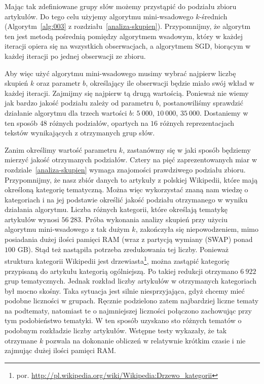 \documentclass{praca1}
\begin{document}
Mając tak zdefiniowane grupy słów możemy przystąpić do podziału zbioru artykułów. Do tego celu użyjemy algorytmu mini-wsadowego $k$-średnich (Algorytm~\ref{alg:003} z rozdziału~\ref{analiza-skupien}). Przypomnijmy, że algorytm ten jest metodą pośrednią pomiędzy algorytmem wsadowym, który w każdej iteracji opiera się na wszystkich obserwacjach, a algorytmem SGD, biorącym w każdej iteracji po jednej obserwacji ze zbioru. 

Aby więc użyć algorytmu mini-wsadowego musimy wybrać najpierw liczbę skupień $k$ oraz parametr $b$, określający ile obserwacji będzie miało swój wkład w każdej iteracji. Zajmijmy się najpierw tą drugą wartością. Ponieważ nie wiemy jak bardzo jakość podziału zależy od parametru $b$, postanowiliśmy sprawdzić działanie algorytmu dla trzech wartości $b$: $5\ 000$, $10\ 000$, $35\ 000$. Dostaniemy w ten sposób 48 różnych podziałów, opartych na $16$ różnych reprezentacjach tekstów wynikających z otrzymanych grup słów.

Zanim określimy wartość parametru $k$, zastanówmy się w jaki sposób będziemy mierzyć jakość otrzymanych podziałów. Cztery na pięć zaprezentowanych miar w rozdziale~\ref{analiza-skupien} wymaga znajomości prawdziwego podziału zbioru. Przypomnijmy, że nasz zbiór danych to artykuły z polskiej Wikipedii, które mają określoną kategorię tematyczną. Można więc wykorzystać znaną nam wiedzę o kategoriach i na jej podstawie określić jakość podziału otrzymanego w wyniku działania algorytmu. Liczba różnych kategorii, które określają tematykę artykułów wynosi $56\ 283$. Próba wykonania analizy skupień przy użyciu algorytmu mini-wsadowego z tak dużym $k$, zakończyła się niepowodzeniem, mimo posiadania dużej ilości pamięci RAM (wraz z partycją wymiany (SWAP) ponad $100$ GB). Stąd też nastąpiła potrzeba zredukowania tej liczby. Ponieważ struktura kategorii Wikipedii jest drzewiasta\footnote{por. \url{http://pl.wikipedia.org/wiki/Wikipedia:Drzewo_kategorii}}, można zastąpić kategorię przypisaną do artykułu kategorią ogólniejszą. Po takiej redukcji otrzymano $6\ 922$ grup tematycznych. Jednak rozkład liczby artykułów w otrzymanych kategoriach był mocno skośny. Taka sytuacja jest silnie niesprzyjająca, gdyż chcemy mieć podobne liczności w grupach. Ręcznie podzielono zatem najbardziej liczne tematy na podtematy, natomiast te o najmniejszej liczności połączono zachowując przy tym podobieństwo tematyki. W ten sposób uzyskano sto różnych tematów o podobnym rozkładzie liczby artykułów. Wstępne testy wykazały, że tak otrzymane $k$ pozwala na dokonanie obliczeń w relatywnie krótkim czasie i nie zajmując dużej ilości pamięci RAM.
\end{document}
